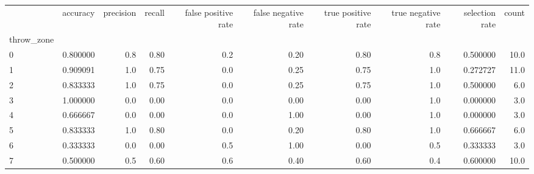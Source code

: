 \begin{tabular}{lrrrrrrrrr}
\toprule
{} &  accuracy &  precision &  recall &  false positive rate &  false negative rate &  true positive rate &  true negative rate &  selection rate &  count \\
throw\_zone &           &            &         &                      &                      &                     &                     &                 &        \\
\midrule
0          &  0.800000 &        0.8 &    0.80 &                  0.2 &                 0.20 &                0.80 &                 0.8 &        0.500000 &   10.0 \\
1          &  0.909091 &        1.0 &    0.75 &                  0.0 &                 0.25 &                0.75 &                 1.0 &        0.272727 &   11.0 \\
2          &  0.833333 &        1.0 &    0.75 &                  0.0 &                 0.25 &                0.75 &                 1.0 &        0.500000 &    6.0 \\
3          &  1.000000 &        0.0 &    0.00 &                  0.0 &                 0.00 &                0.00 &                 1.0 &        0.000000 &    3.0 \\
4          &  0.666667 &        0.0 &    0.00 &                  0.0 &                 1.00 &                0.00 &                 1.0 &        0.000000 &    3.0 \\
5          &  0.833333 &        1.0 &    0.80 &                  0.0 &                 0.20 &                0.80 &                 1.0 &        0.666667 &    6.0 \\
6          &  0.333333 &        0.0 &    0.00 &                  0.5 &                 1.00 &                0.00 &                 0.5 &        0.333333 &    3.0 \\
7          &  0.500000 &        0.5 &    0.60 &                  0.6 &                 0.40 &                0.60 &                 0.4 &        0.600000 &   10.0 \\
\bottomrule
\end{tabular}
